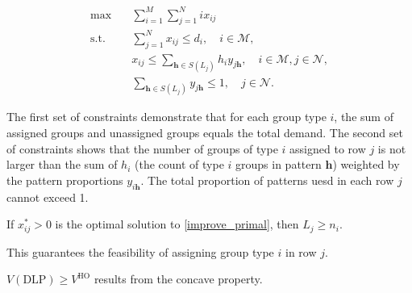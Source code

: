 \begin{equation}\label{improve_primal}
    \begin{aligned}
    \max \quad & \sum_{i=1}^M \sum_{j=1}^N i x_{i j} \\
    \text {s.t.} \quad & \sum_{j=1}^N x_{i j} \leq d_i, \quad i \in \mathcal{M}, \\
    & x_{i j} \leq \sum_{\bm{h} \in S(L_{j})} h_i y_{j \bm{h}}, \quad i \in \mathcal{M}, j \in \mathcal{N}, \\
    & \sum_{\bm{h} \in S(L_{j})} y_{j \bm{h}} \leq 1, \quad j \in \mathcal{N}.
    \end{aligned}
\end{equation}

The first set of constraints demonstrate that for each group type $i$, the sum of assigned groups and unassigned groups equals the total demand. The second set of constraints shows that the number of groups of type $i$ assigned to row $j$ is not larger than the sum of $h_{i}$ (the count of type $i$ groups in pattern $\bm{h}$) weighted by the pattern proportions $y_{i \bm{h}}$. The total proportion of patterns uesd in each row $j$ cannot exceed 1.

\begin{lem}
If $x_{ij}^{*} > 0$ is the optimal solution to \eqref{improve_primal}, then $L_{j} \geq n_{i}$.
\end{lem}

This guarantees the feasibility of assigning group type $i$ in row $j$.



\begin{lem}
$V(\text{DLP}) \geq V^{\text{HO}}$ results from the concave property. 
\end{lem}


